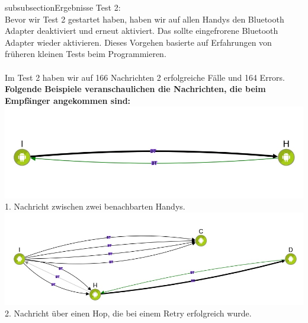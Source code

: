 subsubsection{Ergebnisse Test 2:}\label{ergebnisse-test-2}
\\
Bevor wir Test 2 gestartet haben, haben wir auf allen Handys den
Bluetooth Adapter deaktiviert und erneut aktiviert. Das sollte
eingefrorene Bluetooth Adapter wieder aktivieren. Dieses Vorgehen
basierte auf Erfahrungen von früheren kleinen Tests beim Programmieren.
\\\\
Im Test 2 haben wir auf 166 Nachrichten 2 erfolgreiche Fälle und 164
Errors.
\\
\textbf{Folgende Beispiele veranschaulichen die Nachrichten, die beim
Empfänger angekommen sind:}\\
\includegraphics[width=1.0\textwidth]{belege/grosstests/Bilder/Test2Erfolg1.jpg}\\
 1. Nachricht
zwischen zwei benachbarten Handys.\\
\includegraphics[width=1.0\textwidth]{belege/grosstests/Bilder/Test2Erfolg2.jpg}\\ 2. Nachricht
über einen Hop, die bei einem Retry erfolgreich wurde.\\


